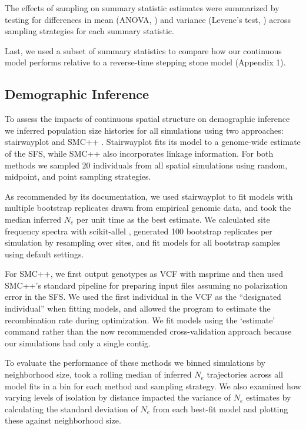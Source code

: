\documentclass[10pt,twoside,lineno,hidelinks]{preprint}
\begin{document}
The effects of sampling on summary statistic estimates were summarized by testing for differences in mean (ANOVA, \citep{Rcore2018}) and variance (Levene's test, \citep{Fox2011}) across sampling strategies for each summary statistic. 

Last, we used a subset of summary statistics to compare how our continuous model performs relative to a reverse-time stepping stone model (Appendix 1). 


\subsection{Demographic Inference}

To assess the impacts of continuous spatial structure on demographic inference we inferred population size histories for all simulations using two approaches: stairwayplot \citep{Liu2015} and SMC++ \citep{Terhorst2016}. Stairwayplot fits its model to a genome-wide estimate of the SFS, while SMC++ also incorporates linkage information. %
For both methods we sampled 20 individuals from all spatial simulations using random, midpoint, and point sampling strategies. 

As recommended by its documentation, we used stairwayplot to fit models with multiple bootstrap replicates drawn from empirical genomic data, and took the median inferred $N_{e}$ per unit time as the best estimate. We calculated site frequency spectra with scikit-allel \citep{Miles2017}, generated 100 bootstrap replicates per simulation by resampling over sites, and fit models for all bootstrap samples using default settings.

For SMC++, we first output genotypes as VCF with msprime and then used SMC++'s standard pipeline for preparing input files assuming no polarization error in the SFS. We used the first individual in the VCF as the ``designated individual'' when fitting models, and allowed the program to estimate the recombination rate during optimization. We fit models using the `estimate' command rather than the now recommended cross-validation approach because our simulations had only a single contig. 

To evaluate the performance of these methods we binned simulations by neighborhood size, took a rolling median of inferred $N_{e}$ trajectories across all model fits in a bin for each method and sampling strategy.  We also examined how varying levels of isolation by distance impacted the variance of $N_{e}$ estimates by calculating the standard deviation of $N_{e}$ from each best-fit model and plotting these against neighborhood size. 
\end{document}
